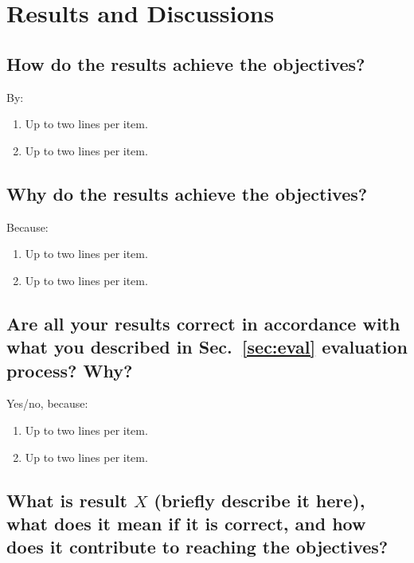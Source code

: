 \section{Results and Discussions}

\subsection{How do the results achieve the objectives?}
By:
\begin{enumerate}
\item Up to two lines per item.
\item Up to two lines per item.
\end{enumerate}
	
\subsection{Why do the results achieve the objectives?}
Because:
\begin{enumerate}
\item Up to two lines per item.
\item Up to two lines per item.
\end{enumerate}

\subsection{Are all your results correct in accordance with what you described in Sec.~\ref{sec:eval} evaluation process? Why?} 
Yes/no, because:
\begin{enumerate}
\item Up to two lines per item.
\item Up to two lines per item.
\end{enumerate}
	
\subsection{What is result $X$ (briefly describe it here), what does it mean if it is correct, and how does it contribute to reaching the objectives?}
\label{sec:resn}
		
